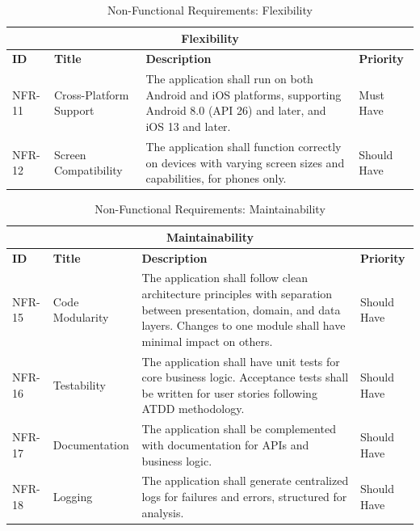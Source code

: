 \vspace{1cm}

\begin{table}[h]
	\centering
	\caption{Non-Functional Requirements: Flexibility}
	\label{tab:nfr-flexibility}
	\begin{tabular}{p{2cm}p{4cm}p{7cm}p{2cm}}
		\toprule
		\multicolumn{4}{c}{\textbf{Flexibility}}\\
		\midrule
		\textbf{ID} & \textbf{Title} & \textbf{Description} & \textbf{Priority} \\
		\midrule
		NFR-11 & Cross-Platform Support & The application shall run on both Android and iOS platforms, supporting Android 8.0 (API 26) and later, and iOS 13 and later. & Must Have \\
		\midrule
		NFR-12 & Screen Compatibility & The application shall function correctly on devices with varying screen sizes and capabilities, for phones only. & Should Have \\
		\bottomrule
	\end{tabular}
\end{table}

\vspace{1cm}

\begin{table}[h]
	\centering
	\caption{Non-Functional Requirements: Maintainability}
	\label{tab:nfr-maintainability}
	\begin{tabular}{p{2cm}p{4cm}p{7cm}p{2cm}}
		\toprule
		\multicolumn{4}{c}{\textbf{Maintainability}}\\
		\midrule
		\textbf{ID} & \textbf{Title} & \textbf{Description} & \textbf{Priority} \\
		\midrule
		NFR-15 & Code Modularity & The application shall follow clean architecture principles with separation between presentation, domain, and data layers. Changes to one module shall have minimal impact on others. & Should Have \\
		\midrule
		NFR-16 & Testability & The application shall have unit tests for core business logic. Acceptance tests shall be written for user stories following ATDD methodology. & Should Have \\
		\midrule
		NFR-17 & Documentation & The application shall be complemented with documentation for APIs and business logic. & Should Have \\
		\midrule
		NFR-18 & Logging & The application shall generate centralized logs for failures and errors, structured for analysis. & Should Have \\
		\bottomrule
	\end{tabular}
\end{table}

